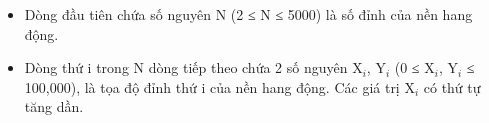 \begin{itemize}
	\item Dòng đầu tiên chứa số nguyên N (2 ≤ N ≤ 5000) là số đỉnh của nền hang động.
	\item Dòng thứ i trong N dòng tiếp theo chứa 2 số nguyên X$_i$, Y$_i $ (0 ≤ X$_i$, Y$_i $ ≤ 100,000), là tọa độ đỉnh thứ i của nền hang động. Các giá trị X$_i $ có thứ tự tăng dần.
\end{itemize}